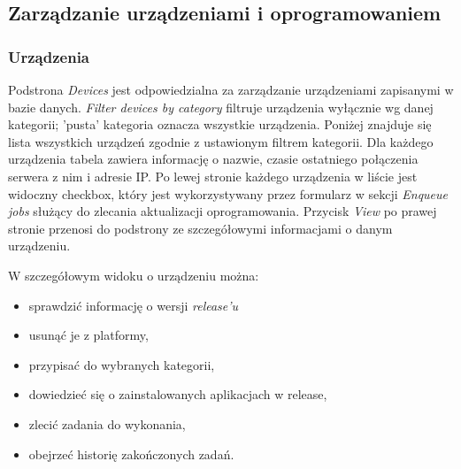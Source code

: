 \documentclass[polish,12pt]{aghthesis}
\begin{document}
\subsection{Zarządzanie urządzeniami i oprogramowaniem}
\subsubsection{Urządzenia}
Podstrona \emph{Devices} jest odpowiedzialna za zarządzanie urządzeniami zapisanymi w bazie danych. \emph{Filter devices by category} filtruje urządzenia wyłącznie wg danej kategorii; 'pusta' kategoria oznacza wszystkie urządzenia. Poniżej znajduje się lista wszystkich urządzeń zgodnie z ustawionym filtrem kategorii. Dla każdego urządzenia tabela zawiera informację o nazwie, czasie ostatniego połączenia serwera z nim i adresie IP. Po lewej stronie każdego urządzenia w liście jest widoczny checkbox, który jest wykorzystywany przez formularz w sekcji \emph{Enqueue jobs} służący do zlecania aktualizacji oprogramowania. Przycisk \emph{View} po prawej stronie przenosi do podstrony ze szczegółowymi informacjami o danym urządzeniu.
\clearpage

\centerline{
}

W szczegółowym widoku o urządzeniu można:
\begin{itemize}
\item sprawdzić informację o wersji \emph{release'u}
\item usunąć je z platformy,
\item przypisać do wybranych kategorii,
\item dowiedzieć się o zainstalowanych aplikacjach w release,
\item zlecić zadania do wykonania,
\item obejrzeć historię zakończonych zadań.
\end{itemize}
\clearpage
\end{document}
